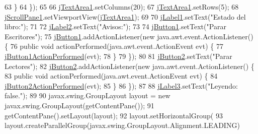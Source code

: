 \begin{DoxyCode}
63             \}
64         \});
65 
66         \mbox{\hyperlink{classpecl2ignacioribera_1_1_libreria_ab9a6d7b400f0ea551dabc5a36c1caebf}{jTextArea1}}.setColumns(20);
67         \mbox{\hyperlink{classpecl2ignacioribera_1_1_libreria_ab9a6d7b400f0ea551dabc5a36c1caebf}{jTextArea1}}.setRows(5);
68         \mbox{\hyperlink{classpecl2ignacioribera_1_1_libreria_aae2f0b8fdb27291df13ef48000cf977a}{jScrollPane1}}.setViewportView(\mbox{\hyperlink{classpecl2ignacioribera_1_1_libreria_ab9a6d7b400f0ea551dabc5a36c1caebf}{jTextArea1}});
69 
70         \mbox{\hyperlink{classpecl2ignacioribera_1_1_libreria_a157484d22a442a3a7ad766b199664464}{jLabel1}}.setText(\textcolor{stringliteral}{"Estado del libro:"});
71 
72         \mbox{\hyperlink{classpecl2ignacioribera_1_1_libreria_ae67eba9f888cfa9d81bf5823148df302}{jLabel2}}.setText(\textcolor{stringliteral}{"Avisos:"});
73 
74         \mbox{\hyperlink{classpecl2ignacioribera_1_1_libreria_a50c2a801f0096a4409e9348d6df5cd09}{jButton1}}.setText(\textcolor{stringliteral}{"Parar Escritores"});
75         \mbox{\hyperlink{classpecl2ignacioribera_1_1_libreria_a50c2a801f0096a4409e9348d6df5cd09}{jButton1}}.addActionListener(\textcolor{keyword}{new} java.awt.event.ActionListener() \{
76             \textcolor{keyword}{public} \textcolor{keywordtype}{void} actionPerformed(java.awt.event.ActionEvent evt) \{
77                 \mbox{\hyperlink{classpecl2ignacioribera_1_1_libreria_a9ecfee92a566b51546110c242da8ff2a}{jButton1ActionPerformed}}(evt);
78             \}
79         \});
80 
81         \mbox{\hyperlink{classpecl2ignacioribera_1_1_libreria_a56f076c83a5c4630f48f3f6ccc764d90}{jButton2}}.setText(\textcolor{stringliteral}{"Parar Lectores"});
82         \mbox{\hyperlink{classpecl2ignacioribera_1_1_libreria_a56f076c83a5c4630f48f3f6ccc764d90}{jButton2}}.addActionListener(\textcolor{keyword}{new} java.awt.event.ActionListener() \{
83             \textcolor{keyword}{public} \textcolor{keywordtype}{void} actionPerformed(java.awt.event.ActionEvent evt) \{
84                 \mbox{\hyperlink{classpecl2ignacioribera_1_1_libreria_ab8cd51249b59ff462fef7822d230c92b}{jButton2ActionPerformed}}(evt);
85             \}
86         \});
87 
88         \mbox{\hyperlink{classpecl2ignacioribera_1_1_libreria_ad4888d81e2513361bb8f3e6c3cb6c7b2}{jLabel3}}.setText(\textcolor{stringliteral}{"Leyendo: false."});
89 
90         javax.swing.GroupLayout layout = \textcolor{keyword}{new} javax.swing.GroupLayout(getContentPane());
91         getContentPane().setLayout(layout);
92         layout.setHorizontalGroup(
93             layout.createParallelGroup(javax.swing.GroupLayout.Alignment.LEADING)

\end{DoxyCode}
